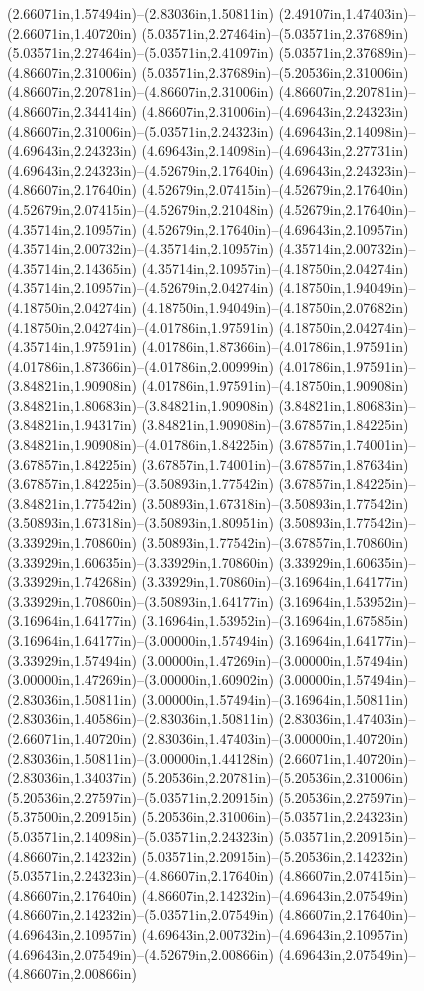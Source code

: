 (2.66071in,1.57494in)--(2.83036in,1.50811in) (2.49107in,1.47403in)--(2.66071in,1.40720in) (5.03571in,2.27464in)--(5.03571in,2.37689in) (5.03571in,2.27464in)--(5.03571in,2.41097in) (5.03571in,2.37689in)--(4.86607in,2.31006in) (5.03571in,2.37689in)--(5.20536in,2.31006in) (4.86607in,2.20781in)--(4.86607in,2.31006in) (4.86607in,2.20781in)--(4.86607in,2.34414in) (4.86607in,2.31006in)--(4.69643in,2.24323in) (4.86607in,2.31006in)--(5.03571in,2.24323in) (4.69643in,2.14098in)--(4.69643in,2.24323in) (4.69643in,2.14098in)--(4.69643in,2.27731in) (4.69643in,2.24323in)--(4.52679in,2.17640in) (4.69643in,2.24323in)--(4.86607in,2.17640in) (4.52679in,2.07415in)--(4.52679in,2.17640in) (4.52679in,2.07415in)--(4.52679in,2.21048in) (4.52679in,2.17640in)--(4.35714in,2.10957in) (4.52679in,2.17640in)--(4.69643in,2.10957in) (4.35714in,2.00732in)--(4.35714in,2.10957in) (4.35714in,2.00732in)--(4.35714in,2.14365in) (4.35714in,2.10957in)--(4.18750in,2.04274in) (4.35714in,2.10957in)--(4.52679in,2.04274in) (4.18750in,1.94049in)--(4.18750in,2.04274in) (4.18750in,1.94049in)--(4.18750in,2.07682in) (4.18750in,2.04274in)--(4.01786in,1.97591in) (4.18750in,2.04274in)--(4.35714in,1.97591in) (4.01786in,1.87366in)--(4.01786in,1.97591in) (4.01786in,1.87366in)--(4.01786in,2.00999in) (4.01786in,1.97591in)--(3.84821in,1.90908in) (4.01786in,1.97591in)--(4.18750in,1.90908in) (3.84821in,1.80683in)--(3.84821in,1.90908in) (3.84821in,1.80683in)--(3.84821in,1.94317in) (3.84821in,1.90908in)--(3.67857in,1.84225in) (3.84821in,1.90908in)--(4.01786in,1.84225in) (3.67857in,1.74001in)--(3.67857in,1.84225in) (3.67857in,1.74001in)--(3.67857in,1.87634in) (3.67857in,1.84225in)--(3.50893in,1.77542in) (3.67857in,1.84225in)--(3.84821in,1.77542in) (3.50893in,1.67318in)--(3.50893in,1.77542in) (3.50893in,1.67318in)--(3.50893in,1.80951in) (3.50893in,1.77542in)--(3.33929in,1.70860in) (3.50893in,1.77542in)--(3.67857in,1.70860in) (3.33929in,1.60635in)--(3.33929in,1.70860in) (3.33929in,1.60635in)--(3.33929in,1.74268in) (3.33929in,1.70860in)--(3.16964in,1.64177in) (3.33929in,1.70860in)--(3.50893in,1.64177in) (3.16964in,1.53952in)--(3.16964in,1.64177in) (3.16964in,1.53952in)--(3.16964in,1.67585in) (3.16964in,1.64177in)--(3.00000in,1.57494in) (3.16964in,1.64177in)--(3.33929in,1.57494in) (3.00000in,1.47269in)--(3.00000in,1.57494in) (3.00000in,1.47269in)--(3.00000in,1.60902in) (3.00000in,1.57494in)--(2.83036in,1.50811in) (3.00000in,1.57494in)--(3.16964in,1.50811in) (2.83036in,1.40586in)--(2.83036in,1.50811in) (2.83036in,1.47403in)--(2.66071in,1.40720in) (2.83036in,1.47403in)--(3.00000in,1.40720in) (2.83036in,1.50811in)--(3.00000in,1.44128in) (2.66071in,1.40720in)--(2.83036in,1.34037in) (5.20536in,2.20781in)--(5.20536in,2.31006in) (5.20536in,2.27597in)--(5.03571in,2.20915in) (5.20536in,2.27597in)--(5.37500in,2.20915in) (5.20536in,2.31006in)--(5.03571in,2.24323in) (5.03571in,2.14098in)--(5.03571in,2.24323in) (5.03571in,2.20915in)--(4.86607in,2.14232in) (5.03571in,2.20915in)--(5.20536in,2.14232in) (5.03571in,2.24323in)--(4.86607in,2.17640in) (4.86607in,2.07415in)--(4.86607in,2.17640in) (4.86607in,2.14232in)--(4.69643in,2.07549in) (4.86607in,2.14232in)--(5.03571in,2.07549in) (4.86607in,2.17640in)--(4.69643in,2.10957in) (4.69643in,2.00732in)--(4.69643in,2.10957in) (4.69643in,2.07549in)--(4.52679in,2.00866in) (4.69643in,2.07549in)--(4.86607in,2.00866in) 
